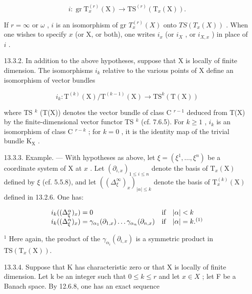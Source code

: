 \[
i \colon \operatorname{gr} \mathrm{T} _ {x} ^ {(r)} (\mathrm{X}) \rightarrow \mathrm{TS} ^ {(r)} (\mathrm{T} _ {x} (\mathrm{X})).
\]

If \(r = \infty\) or \(\omega\) , \(i\) is an isomorphism of gr \(T_x^{(r)}(X)\) onto \(TS(T_x(X))\) . When one wishes to specify \(x\) (or X, or both), one writes \(i_x\) (or \(i_X\) , or \(i_{X,x}\) ) in place of \(i\) .

13.3.2. In addition to the above hypotheses, suppose that X is locally of finite dimension. The isomorphisms \(i_{k}\) relative to the various points of X define an isomorphism of vector bundles

\[
i _ {k} \colon \mathrm{T} ^ {(k)} (\mathrm{X}) / \mathrm{T} ^ {(k - 1)} (\mathrm{X}) \rightarrow \mathrm{TS} ^ {k} (\mathrm{T} (\mathrm{X}))
\]

where TS \(^{k}\) (T(X)) denotes the vector bundle of class C \(^{r-1}\) deduced from T(X) by the finite-dimensional vector functor TS \(^{k}\) (cf. 7.6.5). For \(k \geqslant 1\) , \(i_{k}\) is an isomorphism of class C \(^{r-k}\) ; for \(k = 0\) , it is the identity map of the trivial bundle \(\mathrm{K}_{\mathrm{X}}\) .

13.3.3. Example. --- With hypotheses as above, let \(\xi = (\xi^{1}, \ldots, \xi^{n})\) be a coordinate system of X at \(x\) . Let \((\partial_{i,x})_{1 \leqslant i \leqslant n}\) denote the basis of \(\mathrm{T}_{x}(\mathrm{X})\) defined by \(\xi\) (cf. 5.5.8), and let \(((\Delta_{\xi}^{\infty})_{x})_{|\alpha| \leqslant k}\) denote the basis of \(\mathrm{T}_{x}^{(k)}(\mathrm{X})\) defined in 13.2.6. One has:

\[
\begin{array}{l l} i _ {k} ((\Delta_ {\xi} ^ {\alpha}) _ {x}) = 0 & \text {if} \quad | \alpha | <   k \\ i _ {k} ((\Delta_ {\xi} ^ {\alpha}) _ {x}) = \gamma_ {\alpha_ {1}} (\partial_ {1, x}) \dots \gamma_ {\alpha_ {n}} (\partial_ {n, x}) & \text {if} \quad | \alpha | = k. ^ {(1)} \end{array}
\]

\(^{1}\) Here again, the product of the \(\gamma_{\alpha_{i}}(\partial_{i,x})\) is a symmetric product in \(\mathrm{TS}(\mathrm{T}_{x}(\mathrm{X}))\).

13.3.4. Suppose that K has characteristic zero or that X is locally of finite dimension. Let k be an integer such that \(0 \leqslant k \leqslant r\) and let \(x \in X\) ; let F be a Banach space. By 12.6.8, one has an exact sequence

